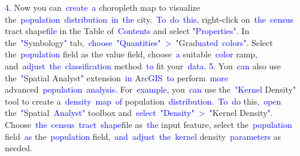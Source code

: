 \documentclass{article}
\begin{document}
\begin{tcolorbox}[colframe=black,colback=white]
{}\textcolor{blue}{4}. Now you can\textcolor{blue}{~create}\textcolor{blue}{~a} choropleth map to visualize the\textcolor{blue}{~population}\textcolor{blue}{~distribution}\textcolor{blue}{~in}\textcolor{blue}{~the} city\textcolor{blue}{.}\textcolor{blue}{~To}\textcolor{blue}{~do}\textcolor{blue}{~this}, right-click on\textcolor{blue}{~the}\textcolor{blue}{~census} tract shape\textcolor{blue}{file} in the Table of\textcolor{blue}{~Contents} and select "\textcolor{blue}{Properties}". In the\textcolor{blue}{~"}\textcolor{blue}{S}ymbology\textcolor{blue}{"} tab,\textcolor{blue}{~choose}\textcolor{blue}{~"}\textcolor{blue}{Quant}\textcolor{blue}{ities}\textcolor{blue}{"}\textcolor{blue}{~>}\textcolor{blue}{~"}Grad\textcolor{blue}{uated}\textcolor{blue}{~colors}\textcolor{blue}{".} Select the\textcolor{blue}{~population} field as the value field\textcolor{blue}{,} choose\textcolor{blue}{~a} suitable\textcolor{blue}{~color} ramp\textcolor{blue}{,} and\textcolor{blue}{~adjust}\textcolor{blue}{~the}\textcolor{blue}{~classification} method\textcolor{blue}{~to} fit your\textcolor{blue}{~data}\textcolor{blue}{.
}\textcolor{blue}{5}. You\textcolor{blue}{~can} also use the\textcolor{blue}{~"}Spatial Analyst\textcolor{blue}{"} extension\textcolor{blue}{~in} Arc\textcolor{blue}{GIS}\textcolor{blue}{~to} perform\textcolor{blue}{~more} advanced\textcolor{blue}{~population}\textcolor{blue}{~analysis}\textcolor{blue}{.} For\textcolor{blue}{~example}\textcolor{blue}{,} you\textcolor{blue}{~can} use the\textcolor{blue}{~"}\textcolor{blue}{Kernel} Density" tool to create a\textcolor{blue}{~density}\textcolor{blue}{~map}\textcolor{blue}{~of} population\textcolor{blue}{~distribution}\textcolor{blue}{.}\textcolor{blue}{~To}\textcolor{blue}{~do} this\textcolor{blue}{,}\textcolor{blue}{~open} the\textcolor{blue}{~"}Spatial\textcolor{blue}{~Analyst}\textcolor{blue}{"} toolbox and\textcolor{blue}{~select}\textcolor{blue}{~"}\textcolor{blue}{Density}\textcolor{blue}{"}\textcolor{blue}{~>}\textcolor{blue}{~"}Kernel Density\textcolor{blue}{".} Choose\textcolor{blue}{~the}\textcolor{blue}{~census}\textcolor{blue}{~tract}\textcolor{blue}{~shape}file as\textcolor{blue}{~the} input feature\textcolor{blue}{,} select the\textcolor{blue}{~population} field\textcolor{blue}{~as} the\textcolor{blue}{~population} field,\textcolor{blue}{~and}\textcolor{blue}{~adjust}\textcolor{blue}{~the}\textcolor{blue}{~kernel} density\textcolor{blue}{~parameters} as needed\textcolor{blue}{.
}
\end{tcolorbox}
\end{document}
